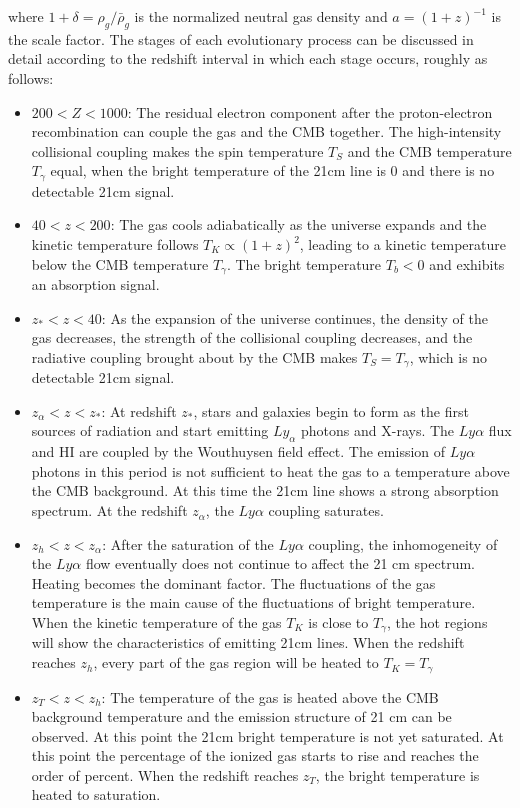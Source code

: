 \documentclass{article}
\begin{document}
where $1+\delta = \rho_g/\bar{\rho}_g$ is the normalized neutral gas density and $a=(1+z)^{-1}$ is the scale factor. The stages of each evolutionary process can be discussed in detail according to the redshift interval in which each stage occurs, roughly as follows:
\begin{itemize}
    \item $200<Z<1000$: The residual electron component after the proton-electron recombination can couple the gas and the CMB together. The high-intensity collisional coupling makes the spin temperature $T_{S}$ and the CMB temperature $T_{\gamma}$ equal, when the bright temperature of the 21cm line is 0 and there is no detectable 21cm signal.
    \item $40<z<200$: The gas cools adiabatically as the universe expands and the kinetic temperature follows $T_K\propto (1+z)^2$, leading to a kinetic temperature below the CMB temperature $T_{\gamma}$. The bright temperature $T_b < 0$ and exhibits an absorption signal. 
    \item $z_*<z<40$: As the expansion of the universe continues, the density of the gas decreases, the strength of the collisional coupling decreases, and the radiative coupling brought about by the CMB makes $T_S=T_{\gamma}$, which is no detectable 21cm signal.
    \item $z_\alpha < z < z_*$: At redshift $z_*$, stars and galaxies begin to form as the first sources of radiation and start emitting $Ly_\alpha$ photons and X-rays. The $Ly\alpha$ flux and HI are coupled by the Wouthuysen field effect. The emission of $Ly\alpha$ photons in this period is not sufficient to heat the gas to a temperature above the CMB background. At this time the 21cm line shows a strong absorption spectrum. At the redshift $z_\alpha$, the $Ly\alpha$ coupling saturates.
    \item $z_h < z < z_\alpha$: After the saturation of the $Ly\alpha$ coupling, the inhomogeneity of the $Ly\alpha$ flow eventually does not continue to affect the 21 cm spectrum. Heating becomes the dominant factor. The fluctuations of the gas temperature is the main cause of the fluctuations of bright temperature. When the kinetic temperature of the gas $T_K$ is close to $T_\gamma$, the hot regions will show the characteristics of emitting 21cm lines. When the redshift reaches $z_h$, every part of the gas region will be heated to $T_K=T_\gamma$
    \item $z_T<z<z_h$: The temperature of the gas is heated above the CMB background temperature and the emission structure of 21 cm can be observed. At this point the 21cm bright temperature is not yet saturated. At this point the percentage of the ionized gas starts to rise and reaches the order of percent. When the redshift reaches $z_T$, the bright temperature is heated to saturation.

\end{itemize}
\end{document}
